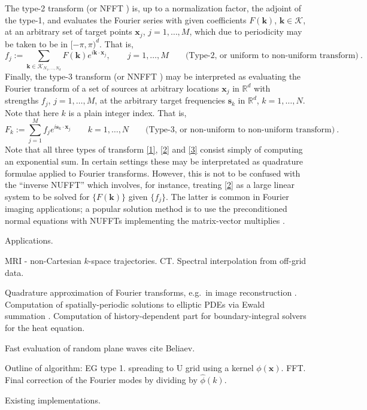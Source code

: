 \documentclass[10pt]{article}
\newcommand{\be}{\begin{equation}}
\newcommand{\ee}{\end{equation}}
\newcommand{\mbf}[1]{{\mathbf #1}}
\newcommand{\RR}{\mathbb{R}}
\newcommand{\xx}{\mbf{x}}
\newcommand{\sss}{\mbf{s}}
\newcommand{\kk}{\mbf{k}}
\newcommand{\KK}{{\mathcal K}}
\newcommand{\NU}{{non-uniform}}
\newcommand{\U}{{uniform}}
\begin{document}
The type-2 transform (or NFFT \cite{usingnfft})
is, up to a normalization factor, the adjoint of the
type-1, and evaluates the Fourier series with given coefficients
$F(\kk)$, $\kk\in\KK$, at an arbitrary set of target points
$\xx_j$, $j=1,\ldots,M$, which due to periodicity may be taken to be in $[-\pi,\pi)^d$.
  That is,
  \be
  f_j := \sum_{\kk\in\KK_{N_1,\dots,N_d}} F(\kk) e^{i \kk\cdot \xx_j},
  \qquad j=1,\dots, M
\qquad \mbox{(Type-2, or \U\ to \NU\ transform)}
~.
\label{2}
\ee
Finally, the type-3 transform
\cite{nufft3} (or NNFFT \cite{usingnfft})
may be interpreted as evaluating the
Fourier transform of a set of sources at arbitrary locations $\xx_j$
in $\RR^d$
with strengths $f_j$, $j=1,\dots, M$, at the arbitrary target frequencies
$\sss_k$ in $\RR^d$, $k=1,\dots, N$. Note that here $k$ is a plain integer
index.
That is,
\be
F_k := \sum_{j=1}^M f_j e^{i \sss_k \cdot \xx_j}
  \qquad k=1,\dots, N
\qquad \mbox{(Type-3, or \NU\ to \NU\ transform)}
~.
\label{3}
\ee
Note that all three types of transform \eqref{1}, \eqref{2} and \eqref{3}
consist simply of computing an exponential sum.
In certain settings these may be interpretated as quadrature formulae
applied to Fourier transforms.
However, this is not to be confused with the ``inverse NUFFT'' which involves,
for instance, treating \eqref{2} as a large linear system to be solved for
$\{F(\kk)\}$ given $\{f_j\}$. The latter is common in Fourier imaging
applications; a popular solution method is to use
the preconditioned normal equations with
NUFFTs implementing the matrix-vector multiplies \cite{fessler,fourmont,fastsinc,gelbrecon}.







Applications.

MRI - non-Cartesian $k$-space trajectories.
CT.
Spectral interpolation from off-grid data.

Quadrature approximation of Fourier transforms, e.g.\
in image reconstruction \cite{cryo}.
Computation of spatially-periodic solutions to elliptic
PDEs via Ewald summation
\cite{lindbo11}.
Computation of history-dependent part for boundary-integral solvers
for the heat equation.%

Fast evaluation of random plane waves cite Beliaev.


Outline of algorithm:
EG type 1.
spreading to U grid using a kernel $\phi(\xx)$.
FFT.
Final correction of the Fourier modes by dividing by
$\hat\phi(k)$.


Existing implementations.
\end{document}
